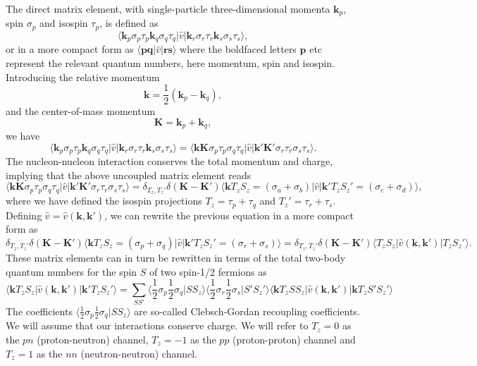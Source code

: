 The direct matrix element, with single-particle three-dimensional
momenta $\mathbf{k}_p$, spin $\sigma_p$ and isospin $\tau_p$, is
defined as
\[
\langle \mathbf{k}_p\sigma_p\tau_p \mathbf{k}_q\sigma_q\tau_q \vert
\hat{v}\vert \mathbf{k}_r\sigma_r\tau_r \mathbf{k}_s\sigma_s\tau_s
\rangle,
\]
or in a more compact form as $\langle \mathbf{p}\mathbf{q}\vert
\hat{v} \vert \mathbf{r}\mathbf{s} \rangle$ where the boldfaced
letters $\mathbf{p}$ etc represent the relevant quantum numbers, here
momentum, spin and isospin. Introducing the relative momentum
\[
\mathbf{k} = \frac{1}{2}\left(\mathbf{k}_p-\mathbf{k}_q\right),
\]
and the center-of-mass momentum
\[
\mathbf{K} = \mathbf{k}_p+\mathbf{k}_q,
\]
we have
\[
\langle \mathbf{k}_p\sigma_p\tau_p \mathbf{k}_q\sigma_q\tau_q \vert
\hat{v}\vert \mathbf{k}_r\sigma_r\tau_r \mathbf{k}_s\sigma_s\tau_s
\rangle=\langle \mathbf{k}\mathbf{K}\sigma_p\tau_p \sigma_q\tau_q
\vert \hat{v}\vert \mathbf{k}'\mathbf{K}'\sigma_r\tau_r \sigma_s\tau_s
\rangle.
\]
The nucleon-nucleon interaction conserves the total momentum and
charge, implying that the above uncoupled matrix element reads
\[
\langle \mathbf{k}\mathbf{K}\sigma_p\tau_p \sigma_q\tau_q \vert
\hat{v}\vert \mathbf{k}'\mathbf{K}'\sigma_r\tau_r \sigma_s\tau_s
\rangle=\delta_{T_z,T_z'}\delta(\mathbf{K}-\mathbf{K}')\langle
\mathbf{k}T_zS_z=(\sigma_a+\sigma_b) \vert \hat{v}\vert
\mathbf{k}'T_zS_z'=(\sigma_c+\sigma_d) \rangle,
\]
where we have defined the isospin projections $T_z=\tau_p+\tau_q$ and
$T_z'=\tau_r+\tau_s$.  Defining
$\hat{v}=\hat{v}(\mathbf{k},\mathbf{k}' )$, we can rewrite the
previous equation in a more compact form as
\[
\delta_{T_z,T_z'}\delta(\mathbf{K}-\mathbf{K}')\langle
\mathbf{k}T_zS_z=(\sigma_p+\sigma_q) \vert \hat{v}\vert
\mathbf{k}'T_zS_z'=(\sigma_r+\sigma_s)
\rangle=\delta_{T_z,T_z'}\delta(\mathbf{K}-\mathbf{K}')\langle
T_zS_z\vert\hat{v}(\mathbf{k},\mathbf{k}' ) \vert T_zS_z' \rangle.
\]
These matrix elements can in turn be rewritten in terms of the total
two-body quantum numbers for the spin $S$ of two spin-1/2 fermions as
\[
\langle \mathbf{k}T_zS_z \vert \hat{v}(\mathbf{k},\mathbf{k}' )\vert
\mathbf{k}'T_zS_z' \rangle=\sum_{SS'}\langle
\frac{1}{2}\sigma_p\frac{1}{2}\sigma_q\vert SS_z\rangle \langle
\frac{1}{2}\sigma_r\frac{1}{2}\sigma_s\vert S'S_z'\rangle \langle
\mathbf{k}T_zSS_z\vert \hat{v}(\mathbf{k},\mathbf{k}' )\vert
\mathbf{k}T_zS'S_z' \rangle
\]
The coefficients $\langle \frac{1}{2}\sigma_p\frac{1}{2}\sigma_q\vert
SS_z\rangle$ are so-called Clebsch-Gordan recoupling coefficients.  We
will assume that our interactions conserve charge. We will refer to $T_z=0$ as the $pn$ (proton-neutron)
channel, $T_z=-1$ as the $pp$ (proton-proton) channel and $T_z=1$ as
the $nn$ (neutron-neutron) channel.

